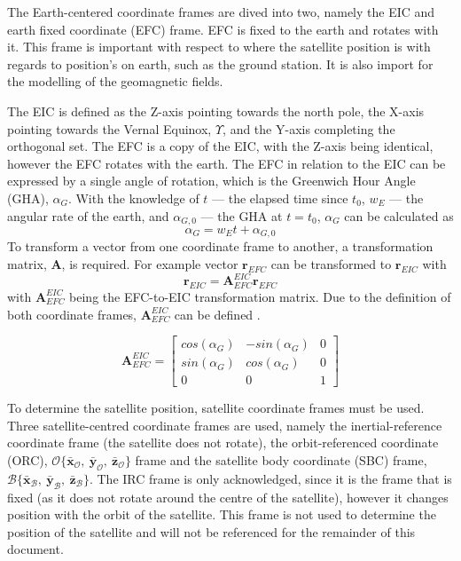 The Earth-centered coordinate frames are dived into two, namely the EIC and earth fixed coordinate (EFC) frame. EFC is fixed to the earth and rotates with it. This frame is important with respect to where the satellite position is with regards to position's on earth, such as the ground station. It is also import for the modelling of the geomagnetic fields. 


The EIC is defined as the Z-axis pointing towards the north pole, the X-axis pointing towards the Vernal Equinox, $\Upsilon$, and the Y-axis completing the orthogonal set. The EFC is a copy of the EIC, with the Z-axis being identical, however the EFC rotates with the earth. The EFC in relation to the EIC can be expressed by a single angle of rotation, which is the Greenwich Hour Angle (GHA), $\alpha_G$. With the knowledge of $t$ --- the elapsed time since $t_0$, $w_E$ --- the angular rate of the earth, and $\alpha_{G,0}$ --- the GHA at $t = t_0$, $\alpha_G$ can be calculated as 
\begin{equation}
\alpha_G = w_Et + \alpha_{G,0}
\end{equation}
To transform a vector from one coordinate frame to another, a transformation matrix, $\boldsymbol{A}$, is required. For example vector $\mathbf{r}_{EFC}$ can be transformed to $\mathbf{r}_{EIC}$ with 
\begin{equation}
\mathbf{r}_{EIC} = \boldsymbol{A}^{EIC}_{EFC}\mathbf{r}_{EFC}
\end{equation}
with $\boldsymbol{A}^{EIC}_{EFC}$ being the EFC-to-EIC transformation matrix. Due to the definition of both coordinate frames, $\boldsymbol{A}^{EIC}_{EFC}$ can be defined .

\begin{equation}
\boldsymbol{A}^{EIC}_{EFC} = 
\begin{bmatrix}
	cos(\alpha_G) & -sin(\alpha_G) & 0\\
	sin(\alpha_G) & cos(\alpha_G) & 0 \\
	0 & 0 & 1
\end{bmatrix}
\end{equation}

To determine the satellite position, satellite coordinate frames must be used. Three satellite-centred coordinate frames are used, namely the inertial-reference coordinate frame (the satellite does not rotate), the orbit-referenced coordinate (ORC), $\mathcal{O}\{\bar{\mathbf{x}}_{\mathcal{O}},~\bar{\mathbf{y}}_{\mathcal{O}},~\bar{\mathbf{z}}_{\mathcal{O}}\}$ frame and the satellite body coordinate (SBC) frame, $\mathcal{B}\{\bar{\mathbf{x}}_{\mathcal{B}},~\bar{\mathbf{y}}_{\mathcal{B}},~\bar{\mathbf{z}}_{\mathcal{B}}\}$. The IRC frame is only acknowledged, since it is the frame that is fixed (as it does not rotate around the centre of the satellite), however it changes position with the orbit of the satellite. This frame is not used to determine the position of the satellite and will not be referenced for the remainder of this document.

